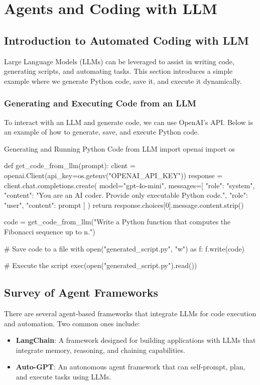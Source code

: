 
\chapter{Agents and Coding with LLM}

\section{Introduction to Automated Coding with LLM}
Large Language Models (LLMs) can be leveraged to assist in writing code, generating scripts, and automating tasks. This section introduces a simple example where we generate Python code, save it, and execute it dynamically.

\subsection{Generating and Executing Code from an LLM}
To interact with an LLM and generate code, we can use OpenAI’s API. Below is an example of how to generate, save, and execute Python code.

\begin{codeonly}{Generating and Running Python Code from LLM}
import openai
import os

def get_code_from_llm(prompt):
    client = openai.Client(api_key=os.getenv("OPENAI_API_KEY"))
    response = client.chat.completions.create(
        model="gpt-4o-mini",
        messages=[
            {"role": "system", "content": "You are an AI coder. Provide only executable Python code."},
            {"role": "user", "content": prompt}
        ]
    )
    return response.choices[0].message.content.strip()

code = get_code_from_llm("Write a Python function that computes the Fibonacci sequence up to n.")

# Save code to a file
with open("generated_script.py", "w") as f:
    f.write(code)

# Execute the script
exec(open("generated_script.py").read())
\end{codeonly}

\section{Survey of Agent Frameworks}
There are several agent-based frameworks that integrate LLMs for code execution and automation. Two common ones include:

\begin{itemize}
\item
{\bf LangChain}: A framework designed for building applications with LLMs that integrate memory, reasoning, and chaining capabilities.
\item
{\bf Auto-GPT}: An autonomous agent framework that can self-prompt, plan, and execute tasks using LLMs.
\end{itemize}

